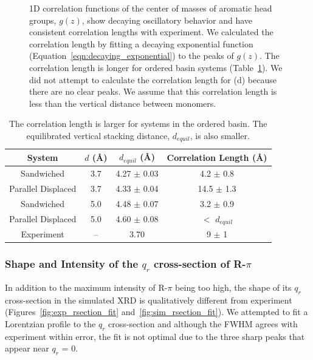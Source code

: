 \documentclass[journal=jpcbfk,manuscript=article]{achemso}
\begin{document}
\begin{figure}[!htb]
  \caption{1D correlation functions of the center of masses of aromatic head
	  groups, $g(z)$, show decaying oscillatory behavior and have consistent correlation lengths with experiment. We calculated the
	  correlation length by fitting a decaying exponential function
	  (Equation~\ref{eqn:decaying_exponential}) to the peaks of $g(z)$. The
	  correlation length is longer for ordered basin systems
	  (Table~\ref{table:correlation_length}). We did not attempt to calculate the
	  correlation length for (d) because there are no clear peaks. We assume that this
	  correlation length is less than the vertical distance between monomers.}\label{fig:correlation}
  \end{figure}  
  
  \begin{table}[h]
  \centering
  \begin{tabular}{cccc}
  \toprule
  System             & $\mathit{d}$ (\AA) & $\mathit{d}_{equil}$ (\AA) & Correlation Length (\AA) \\
  \midrule
  Sandwiched         & 3.7                &    4.27 $\pm$ 0.03         & 4.2 $\pm$ 0.8            \\
  Parallel Displaced & 3.7                &    4.33 $\pm$ 0.04         & 14.5 $\pm$ 1.3           \\ 
  Sandwiched         & 5.0                &    4.48 $\pm$ 0.07         & 3.2 $\pm$ 0.9            \\
  Parallel Displaced & 5.0                &    4.60 $\pm$ 0.08         & $<$ $d_{equil}$ \\ 
  Experiment         & --                 &    3.70                    & 9 $\pm$ 1               \\
  \bottomrule
  \end{tabular}
  \caption{The correlation length is larger for systems in the ordered basin. The equilibrated vertical
  stacking distance, $\mathit{d}_{equil}$, is also smaller.}
  \label{table:correlation_length}
  \end{table}

  \subsubsection*{Shape and Intensity of the $q_r$ cross-section of R-$\pi$}

  In addition to the maximum intensity of R-$\pi$ being too high, the shape
  of its $q_r$ cross-section in the simulated XRD is qualitatively different
  from experiment (Figures~\ref{fig:exp_rsection_fit}
  and~\ref{fig:sim_rsection_fit}). We attempted to fit a Lorentzian profile to 
  the $q_r$ cross-section and although the FWHM agrees with experiment within
  error, the fit is not optimal due to the three sharp peaks that appear near
  $q_r$ = 0. 
  
\end{document}
